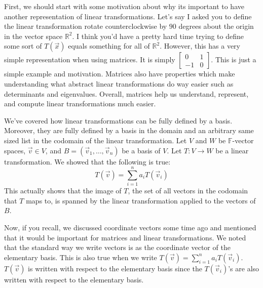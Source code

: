 First, we should start with some motivation about why its important to have another representation of linear transformations. Let's say I asked you to define the linear transformation rotate counterclockwise by $90$ degrees about the origin in the vector space $\mathbb{R}^2$. I think you'd have a pretty hard time trying to define some sort of $T(\vec{x})$ equals something for all of $\mathbb{R}^2$. However, this has a very simple representation when using matrices. It is simply $\left[\begin{smallmatrix}
    0 & 1 \\ -1 & 0
\end{smallmatrix}\right]$. This is just a simple example and motivation. Matrices also have properties which make understanding what abstract linear transformations do way easier such as determinants and eigenvalues. Overall, matrices help us understand, represent, and compute linear transformations much easier.

We’ve covered how linear transformations can be fully defined by a basis. Moreover, they are
fully defined by a basis in the domain and an arbitrary same sized list in the codomain of the linear
transformation. Let $V$ and $W$ be $\mathbb{F}$-vector spaces, $\vec{v}\in V$, and $B=(\vec{v}_1,\ldots,\vec{v}_n)$ be a basis of $V$. Let $T:V\to W$ be a linear transformation. We showed that the following is true:
$$T(\vec{v})=\sum_{i=1}^n a_iT(\vec{v}_i)$$
This actually shows that the image of $T$, the set of all vectors in the codomain that $T$ maps to, is spanned by the linear transformation applied to the vectors of $B$.

Now, if you recall, we discussed coordinate vectors some time ago and mentioned that it would be important for matrices and linear transformations. We noted that the standard way we write vectors is as the coordinate vector of the elementary basis. This is also true when we write $T(\vec{v})=\sum_{i=1}^n a_iT(\vec{v}_i)$. $T(\vec{v})$ is written with respect to the elementary basis since the $T(\vec{v}_i)$'s are also written with respect to the elementary basis. 

